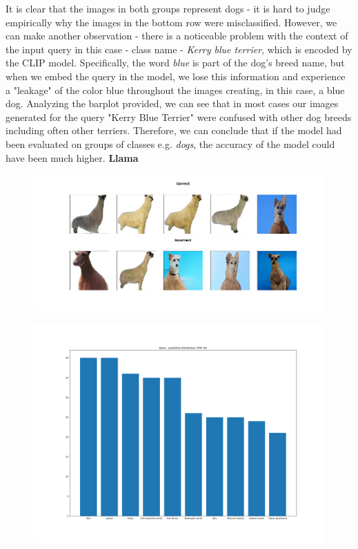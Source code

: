 \documentclass[11pt,a4paper,openany]{book}
\begin{document}
\newline
\noindent It is clear that the images in both groups represent dogs - it is hard to judge empirically why the images in the bottom row were misclassified. However, we can make another observation - there is a noticeable problem with the context of the input query in this case - class name - \textit{Kerry blue terrier}, which is encoded by the CLIP model. Specifically, the word \textit{blue} is part of the dog's breed name, but when we embed the query in the model, we lose this information and experience a "leakage" of the color blue throughout the images creating, in this case, a blue dog.  Analyzing the barplot provided, we can see that in most cases our images generated for the query "Kerry Blue Terrier" were confused with other dog breeds including often other terriers. Therefore, we can conclude that if the model had been evaluated on groups of classes e.g. \textit{dogs}, the accuracy of the model could have been much higher.
\newline
\noindent \textbf{Llama} \\
\begin{figure}[ht!]
    \centering
    \includegraphics[scale=0.4]{figs/imagenet_examples/llama.png}
\end{figure}
\begin{figure}[ht!]
    \centering
    \includegraphics[scale=0.3]{figs/imagenet_examples/llama_imagenet_dist.png}
\end{figure}
\end{document}
